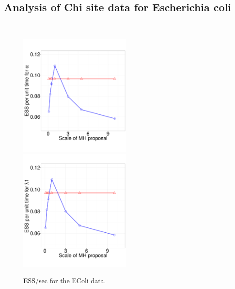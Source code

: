 {  \subsection{Analysis of Chi site data for Escherichia coli}~
  \begin{figure}%
    \vspace{-.2in}
  \centering
  \begin{minipage}[!hp]{.2\linewidth}
    \caption{ESS/sec for the EColi data.}
     \label{fig:ECOLI}
  \end{minipage}
  \begin{minipage}[!hp]{.05\linewidth}
    \hspace{.1in}
  \end{minipage}
  \begin{minipage}[!hp]{.7\linewidth}
    \includegraphics [width=0.5\textwidth, angle=0]{figs/ECOLI_alpha.pdf}
    \includegraphics [width=0.5\textwidth, angle=0]{figs/ECOLI_l1.pdf}
    \vspace{-.2in}

\end{minipage}
\end{figure}}
